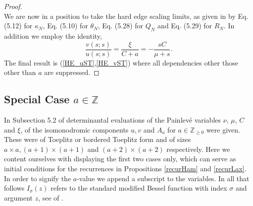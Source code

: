 \documentclass[10pt,reqno]{amsart}
\theoremstyle{plain}
\theoremstyle{definition}
\theoremstyle{remark}
\begin{document}
\begin{proof}
\begin{equation}
\end{equation}
We are now in a position to take the hard edge scaling limits, as given in \cite{FW_2007} by
Eq. (5.12) for $ \kappa_N $, Eq. (5.10) for $ \theta_N $, Eq. (5.28) for $ Q_N $ and Eq. (5.29) for $ R_N $.
In addition we employ the identity, \cite[Eq. (5.45)]{FW_2007}
\begin{equation}        
    \frac{v(s;s)}{u(s;s)} = \frac{\xi}{C+a} = -\frac{sC}{\mu+s} .                               
\end{equation}
The final result is (\ref{HE_uST},\ref{HE_vST}) where all dependencies other those other than $ a $
are suppressed.
\end{proof}

\subsection{Special Case $ a\in {\mathbb Z} $}\label{SS:integer_a}
In Subsection 5.2 of \cite{FW_2007} determinantal evaluations of the Painlev\'e variables $ \nu$, $\mu$, $C$ and $\xi $, of the 
isomonodromic components $ u,v $ and $ A_a $ for $ a \in {\mathbb Z}_{{\geqslant} 0} $ were given. These were of 
Toeplitz or bordered Toeplitz form and of sizes $ a\times a, (a+1)\times(a+1) $ and $ (a+2)\times(a+2) $
respectively. Here we content ourselves with displaying the first two cases only, which can serve as
initial conditions for the recurrences in Propositions \ref{recurHam} and \ref{recurLax}. In order to signify 
the $ a $-value we append a subscript to the variables. In all that follows $ I_{\sigma}(z) $ refers to the
standard modified Bessel function with index $ \sigma $ and argument $ z $, see  of \cite{DLMF}.
\end{document}
